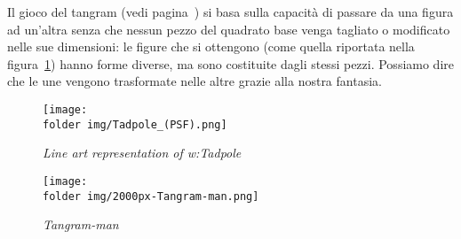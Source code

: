 Il gioco del tangram (vedi pagina~\pageref{tangram}) si basa sulla 
capacità di passare da una figura ad un'altra senza che nessun pezzo 
del quadrato base venga tagliato o modificato nelle sue dimensioni: 
le figure che si ottengono (come quella riportata nella 
figura~\ref{fig:tangramman}) hanno forme diverse, ma sono costituite 
dagli stessi pezzi. Possiamo dire che le une vengono trasformate 
nelle altre grazie alla nostra fantasia.


\begin{inaccessibleblock}
 \begin{figure}[!htb]
\begin{center}
 \noindent\begin{minipage}{0.6\textwidth}
   \centering
   \texttt{[image: \\folder img/Tadpole\_(PSF).png]}
   \caption{\emph{Line art representation of 
w:Tadpole}\protect\footnotemark}\label{fig:tadpole}
 \end{minipage}
\hspace{7mm}
 \noindent\begin{minipage}{0.26\textwidth}
  \centering
   \texttt{[image: \\folder img/2000px-Tangram-man.png]}
   
\caption{\emph{Tangram-man}\protect\footnotemark}
\label{fig:tangramman}
 \end{minipage}
\end{center}
\end{figure}
\end{inaccessibleblock}

%
%		
%			

